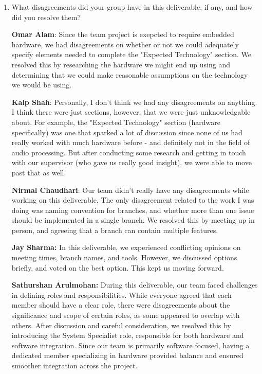 \documentclass{article}
\begin{document}
\begin{enumerate}
    \item What disagreements did your group have in this deliverable, if any,
    and how did you resolve them?

    \textbf{Omar Alam}: Since the team project is exepcted to require embedded
    hardware, we had disagreements on whether or not we could adequately specify
    elements needed to complete the "Expected Technology" section. We resolved
    this by researching the hardware we might end up using and determining that
    we could make reasonable assumptions on the technology we would be using.

    \textbf{Kalp Shah}: Personally, I don't think we had any disagreements on
    anything. I think there were just sections, however, that we were just
    unknowledgable about. For example, the "Expected Technology" section
    (hardware specifically) was one that sparked a lot of discussion since none
    of us had really worked with much hardware before - and definitely not in
    the field of audio processing. But after conducting some research and
    getting in touch with our supervisor (who gave us really good insight), we
    were able to move past that as well. 
    
    \textbf{Nirmal Chaudhari}: Our team didn't really have any disagreements
    while working on this deliverable. The only disagreement related to the work
    I was doing was naming convention for branches, and whether more than one
    issue should be implemented in a single branch. We resolved this by meeting
    up in person, and agreeing that a branch can contain multiple features. 
    
    \textbf{Jay Sharma:} In this deliverable, we experienced conflicting
    opinions on meeting times, branch names, and tools. However, we discussed
    options briefly, and voted on the best option. This kept us moving forward.

    \textbf{Sathurshan Arulmohan:} During this deliverable, our team faced
    challenges in defining roles and responsibilities. While everyone agreed
    that each member should have a clear role, there were disagreements about
    the significance and scope of certain roles, as some appeared to overlap
    with others. After discussion and careful consideration, we resolved this by
    introducing the System Specialist role, responsible for both hardware and
    software integration. Since our team is primarily software focused, having a
    dedicated member specializing in hardware provided balance and ensured
    smoother integration across the project.

\end{enumerate}
\end{document}
